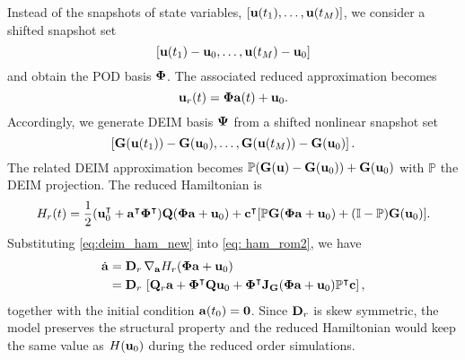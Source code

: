 \documentclass[11pt]{article}
\newcommand{\bJ}{{\bf J}}
\begin{document}
Instead of the snapshots of state variables, $\left[{\bf u}(t_1), \ldots, {\bf u}(t_M)\right]$, we consider a shifted snapshot set
\begin{equation}
\left[{\bf u}(t_1)-{\bf u}_0, \ldots, {\bf u}(t_M)-{\bf u}_0\right]
\label{eq: snap_shift}
\end{equation}
and obtain the POD basis $\boldsymbol{\Phi}$. The associated reduced approximation becomes
\begin{equation}
{\bf u}_r(t)= \boldsymbol{\Phi} {{\bf a}}(t) + {\bf u}_0. 
\label{eq: pod_shift}
\end{equation}
Accordingly, we generate DEIM basis $\boldsymbol{\Psi}$ from a shifted nonlinear snapshot set 
\begin{equation}
\left[{\bf G}({\bf u}(t_1))-{\bf G}({\bf u}_0), \ldots, {\bf G}({\bf u}(t_M))-{\bf G}({\bf u}_0) \right].
\label{eq: nonlsnap_shift}
\end{equation}
The related DEIM approximation becomes
$
\mathbb{P} ({\bf G}({\bf u})-{\bf G}({\bf u}_0)) + {\bf G}({\bf u}_0)
$
with $\mathbb{P}$ the DEIM projection. The reduced Hamiltonian is 
\begin{equation}
H_r(t) = \frac{1}{2} ({\bf u}_0^\intercal + {\bf a}^\intercal \boldsymbol{\Phi}^\intercal) {\bf Q} (\boldsymbol{\Phi} {\bf a}+{\bf u}_0) 
+ {\bf c}^\intercal [\mathbb{P}{\bf G} (\boldsymbol{\Phi} {\bf a}+{\bf u}_0) + (\mathbb{I}-\mathbb{P}) {\bf G}({\bf u}_0)]. 
\label{eq:deim_ham_new}
\end{equation}
%
Substituting \eqref{eq:deim_ham_new} into \eqref{eq: ham_rom2}, we have
\begin{equation}
\begin{aligned}
\dot{{\ba}} &= \bD_r\, \nabla_{\ba} H_r(\bPhi \ba + \bu_0) \\
			&= \bD_r\, \left[\bQ_r \ba + \bPhi^\intercal \bQ \bu_0 + \bPhi^\intercal \bJ_{\bG} (\bPhi \ba + \bu_0) \mathbb{P}^\intercal \bc\right], 
\label{eq: ham_rom3}
\end{aligned}
\end{equation}
together with the initial condition ${{\bf a}}(t_0) = \bf{0}$.
Since ${\bf D}_r$ is skew symmetric, the model preserves the structural property and the reduced Hamiltonian would keep the same value as $H({\bf u}_0)$ during the reduced order simulations. 

\end{document}

